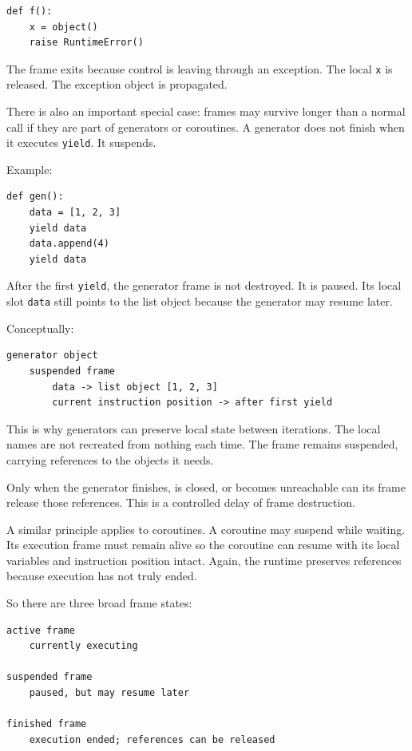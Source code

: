 \begin{verbatim}
def f():
    x = object()
    raise RuntimeError()
\end{verbatim}

The frame exits because control is leaving through an exception. The local \texttt{x} is released. The exception object is propagated.

There is also an important special case: frames may survive longer than a normal call if they are part of generators or coroutines. A generator does not finish when it executes \texttt{yield}. It suspends.

Example:

\begin{verbatim}
def gen():
    data = [1, 2, 3]
    yield data
    data.append(4)
    yield data
\end{verbatim}

After the first \texttt{yield}, the generator frame is not destroyed. It is paused. Its local slot \texttt{data} still points to the list object because the generator may resume later.

Conceptually:

\begin{verbatim}
generator object
    suspended frame
        data -> list object [1, 2, 3]
        current instruction position -> after first yield
\end{verbatim}

This is why generators can preserve local state between iterations. The local names are not recreated from nothing each time. The frame remains suspended, carrying references to the objects it needs.

Only when the generator finishes, is closed, or becomes unreachable can its frame release those references. This is a controlled delay of frame destruction.

A similar principle applies to coroutines. A coroutine may suspend while waiting. Its execution frame must remain alive so the coroutine can resume with its local variables and instruction position intact. Again, the runtime preserves references because execution has not truly ended.

So there are three broad frame states:

\begin{verbatim}
active frame
    currently executing

suspended frame
    paused, but may resume later

finished frame
    execution ended; references can be released
\end{verbatim}


